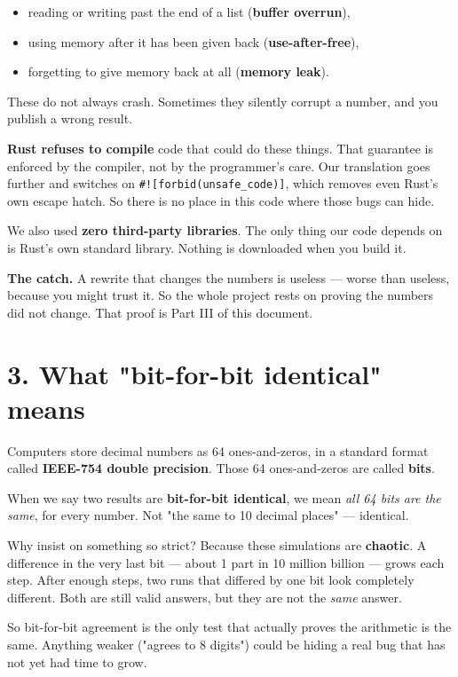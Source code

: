 \documentclass[11pt]{article}
\begin{document}
\begin{itemize}
\item reading or writing past the end of a list (\textbf{buffer overrun}),
\item using memory after it has been given back (\textbf{use-after-free}),
\item forgetting to give memory back at all (\textbf{memory leak}).
\end{itemize}

These do not always crash. Sometimes they silently corrupt a number, and you publish a wrong result.

\textbf{Rust refuses to compile} code that could do these things. That guarantee is enforced by the compiler, not by the programmer's care. Our translation goes further and switches on \texttt{\#![forbid(unsafe\_code)]}, which removes even Rust's own escape hatch. So there is no place in this code where those bugs can hide.

We also used \textbf{zero third-party libraries}. The only thing our code depends on is Rust's own standard library. Nothing is downloaded when you build it.

\textbf{The catch.} A rewrite that changes the numbers is useless --- worse than useless, because you might trust it. So the whole project rests on proving the numbers did not change. That proof is Part III of this document.

\section{3. What "bit-for-bit identical" means}

Computers store decimal numbers as 64 ones-and-zeros, in a standard format called \textbf{IEEE-754 double precision}. Those 64 ones-and-zeros are called \textbf{bits}.

When we say two results are \textbf{bit-for-bit identical}, we mean \emph{all 64 bits are the same}, for every number. Not "the same to 10 decimal places" --- identical.

Why insist on something so strict? Because these simulations are \textbf{chaotic}. A difference in the very last bit --- about 1 part in 10 million billion --- grows each step. After enough steps, two runs that differed by one bit look completely different. Both are still valid answers, but they are not the \emph{same} answer.

So bit-for-bit agreement is the only test that actually proves the arithmetic is the same. Anything weaker ("agrees to 8 digits") could be hiding a real bug that has not yet had time to grow.
\end{document}
